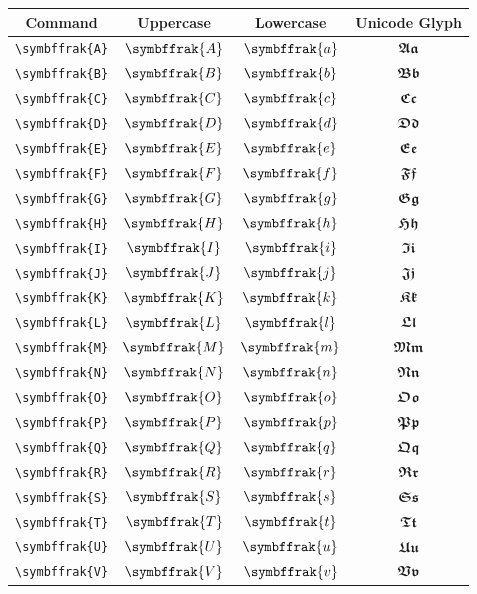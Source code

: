 \documentclass[12pt,a4paper]{article}
\begin{document}
\begin{longtable}{|c|c|c|c|}
\hline
\textbf{Command} & \textbf{Uppercase} & \textbf{Lowercase} & \textbf{Unicode Glyph} \\
\hline
\verb|\symbffrak{A}| & $\symbffrak{A}$ & $\symbffrak{a}$ & $ 𝕬 𝖆 $ \\
\verb|\symbffrak{B}| & $\symbffrak{B}$ & $\symbffrak{b}$ & $ 𝕭 𝖇 $ \\
\verb|\symbffrak{C}| & $\symbffrak{C}$ & $\symbffrak{c}$ & $ 𝕮 𝖈 $ \\
\verb|\symbffrak{D}| & $\symbffrak{D}$ & $\symbffrak{d}$ & $ 𝕯 𝖉 $ \\
\verb|\symbffrak{E}| & $\symbffrak{E}$ & $\symbffrak{e}$ & $ 𝕰 𝖊 $ \\
\verb|\symbffrak{F}| & $\symbffrak{F}$ & $\symbffrak{f}$ & $ 𝕱 𝖋 $ \\
\verb|\symbffrak{G}| & $\symbffrak{G}$ & $\symbffrak{g}$ & $ 𝕲 𝖌 $ \\
\verb|\symbffrak{H}| & $\symbffrak{H}$ & $\symbffrak{h}$ & $ 𝕳 𝖍 $ \\
\verb|\symbffrak{I}| & $\symbffrak{I}$ & $\symbffrak{i}$ & $ 𝕴 𝖎 $ \\
\verb|\symbffrak{J}| & $\symbffrak{J}$ & $\symbffrak{j}$ & $ 𝕵 𝖏 $ \\
\verb|\symbffrak{K}| & $\symbffrak{K}$ & $\symbffrak{k}$ & $ 𝕶 𝖐 $ \\
\verb|\symbffrak{L}| & $\symbffrak{L}$ & $\symbffrak{l}$ & $ 𝕷 𝖑 $ \\
\verb|\symbffrak{M}| & $\symbffrak{M}$ & $\symbffrak{m}$ & $ 𝕸 𝖒 $ \\
\verb|\symbffrak{N}| & $\symbffrak{N}$ & $\symbffrak{n}$ & $ 𝕹 𝖓 $ \\
\verb|\symbffrak{O}| & $\symbffrak{O}$ & $\symbffrak{o}$ & $ 𝕺 𝖔 $ \\
\verb|\symbffrak{P}| & $\symbffrak{P}$ & $\symbffrak{p}$ & $ 𝕻 𝖕 $ \\
\verb|\symbffrak{Q}| & $\symbffrak{Q}$ & $\symbffrak{q}$ & $ 𝕼 𝖖 $ \\
\verb|\symbffrak{R}| & $\symbffrak{R}$ & $\symbffrak{r}$ & $ 𝕽 𝖗 $ \\
\verb|\symbffrak{S}| & $\symbffrak{S}$ & $\symbffrak{s}$ & $ 𝕾 𝖘 $ \\
\verb|\symbffrak{T}| & $\symbffrak{T}$ & $\symbffrak{t}$ & $ 𝕿 𝖙 $ \\
\verb|\symbffrak{U}| & $\symbffrak{U}$ & $\symbffrak{u}$ & $ 𝖀 𝖚 $ \\
\verb|\symbffrak{V}| & $\symbffrak{V}$ & $\symbffrak{v}$ & $ 𝖁 𝖛 $ \\

\end{longtable}
\end{document}
